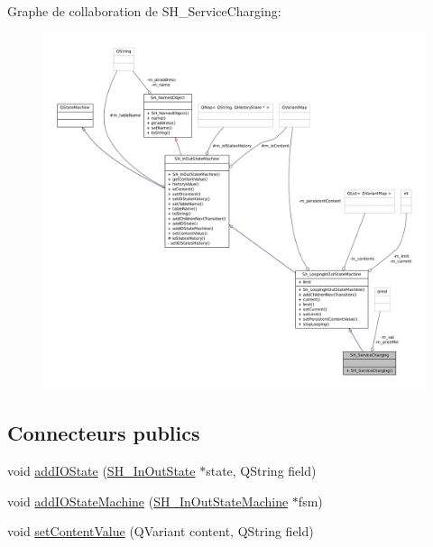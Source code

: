 Graphe de collaboration de S\-H\-\_\-\-Service\-Charging\-:
\nopagebreak
\begin{figure}[H]
\begin{center}
\leavevmode
\includegraphics[width=350pt]{classSH__ServiceCharging__coll__graph}
\end{center}
\end{figure}
\subsection*{Connecteurs publics}
\begin{DoxyCompactItemize}
\item 
void \hyperlink{classSH__InOutStateMachine_ad6b778d052f741daee720c047059ce0e}{add\-I\-O\-State} (\hyperlink{classSH__InOutState}{S\-H\-\_\-\-In\-Out\-State} $\ast$state, Q\-String field)
\item 
void \hyperlink{classSH__InOutStateMachine_a56954869252c7f1980abf37df9919b5e}{add\-I\-O\-State\-Machine} (\hyperlink{classSH__InOutStateMachine}{S\-H\-\_\-\-In\-Out\-State\-Machine} $\ast$fsm)
\item 
void \hyperlink{classSH__InOutStateMachine_aa2766b7a7ba39c35a10df7fc0c151b4f}{set\-Content\-Value} (Q\-Variant content, Q\-String field)
\end{DoxyCompactItemize}
